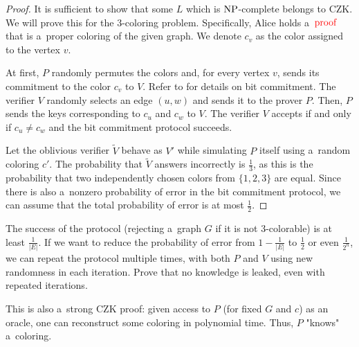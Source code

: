 \begin{proof}
    It is sufficient to show that some $L$ which is $\operatorname{NP}$-complete belongs to $\mathrm{CZK}$.
    We will prove this for the 3-coloring problem.
    Specifically, Alice holds a~$\textcolor{red}{\text{proof}}$ that is a~proper coloring of the given graph.
    We denote $c_v$ as the color assigned to the vertex $v$.

    At first, $P$ randomly permutes the colors and, for every vertex $v$, sends its commitment to the color $c_v$ to $V$.
    Refer to  for details on bit commitment.
    The verifier $V$ randomly selects an edge $(u, w)$ and sends it to the prover $P$.
    Then, $P$ sends the keys corresponding to $c_u$ and $c_w$ to $V$.
    The verifier $V$ accepts if and only if $c_u \neq c_w$ and the bit commitment protocol succeeds.

    Let the oblivious verifier $\tilde{V}$ behave as $V'$ while simulating $P$ itself using a~random coloring $c'$.
    The probability that $\tilde{V}$ answers incorrectly is $\frac{1}{3}$, as this is the probability that two independently chosen colors from $\{ 1, 2, 3 \}$ are equal.
    Since there is also a~nonzero probability of error in the bit commitment protocol, we can assume that the total probability of error is at most $\frac{1}{2}$.

\end{proof}

\begin{exercise}
    The success of the protocol (rejecting a~graph $G$ if it is not 3-colorable) is at least $\frac{1}{|E|}$.
    If we want to reduce the probability of error from $1 - \frac{1}{|E|}$ to $\frac{1}{2}$ or even $\frac{1}{2^{n}}$, we can repeat the protocol multiple times, with both $P$ and $V$ using new randomness in each iteration.
    Prove that no knowledge is leaked, even with repeated iterations.
\end{exercise}

\begin{remark}
    This is also a~strong $\mathrm{CZK}$ proof: given access to $P$ (for fixed $G$ and $c$) as an oracle, one can reconstruct some coloring in polynomial time.
    Thus, $P$ "knows" a~coloring.

\end{remark}

